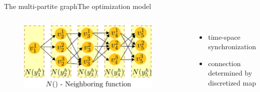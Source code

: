 \begin{frame}{The multi-partite graph}{The optimization model}

\begin{columns}

\begin{minipage}[c]{\textwidth}
\begin{figure}
\centering
\includegraphics[width = 0.9\textwidth]{./figure/MultiPartite}
\end{figure}
\end{minipage}

\begin{minipage}[c]{\textwidth}
\begin{itemize}
\item time-space synchronization
\item connection determined by discretized map
\end{itemize}
\end{minipage}

\end{columns}

\end{frame}

